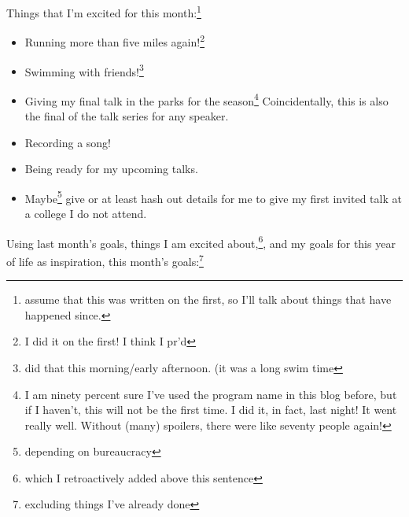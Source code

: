 \documentclass[12pt]{article}[titlepage]
\renewcommand{\,}{\textsuperscript{,}}
\begin{document}
Things that I'm excited for this month:\footnote{assume that this was written on the first, so I'll talk about things that have happened since.}
\begin{itemize}
\item Running more than five miles again!\footnote{I did it on the first! I think I pr'd}
\item Swimming with friends!\footnote{did that this morning/early afternoon. (it was a long swim time}
\item Giving my final talk in the parks for the season\footnote{I am ninety percent sure I've used the program name in this blog before, but if I haven't, this will not be the first time. I did it, in fact, last night! It went really well. Without (many) spoilers, there were like seventy people again!}
Coincidentally, this is also the final of the talk series for any speaker.
\item Recording a song!
\item Being ready for my upcoming talks.
\item Maybe\footnote{depending on bureaucracy} give or at least hash out details for me to give my first invited talk at a college I do not attend.
\end{itemize}
Using last month's goals, things I am excited about,\footnote{which I retroactively added above this sentence}, and my goals for this year of life as inspiration, this month's goals:\footnote{excluding things I've already done}
\end{document}
